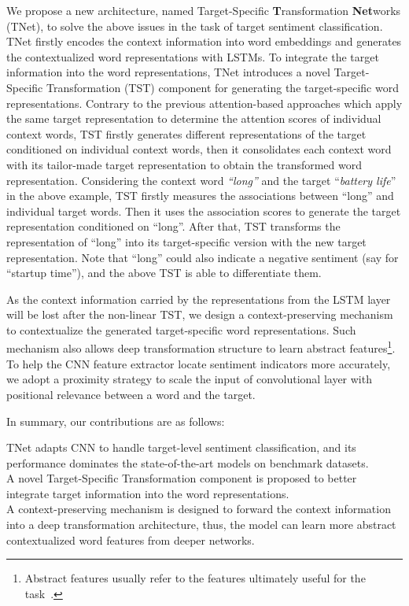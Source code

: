 \documentclass[11pt,a4paper]{article}
\begin{document}
We propose a new architecture, named Target-Specific \textbf{T}ransformation \textbf{Net}works (TNet), to solve the above issues in the task of target sentiment classification. TNet firstly encodes the context information into word embeddings and generates the contextualized word representations with LSTMs. To integrate the target information into the word representations, TNet introduces a novel Target-Specific Transformation (TST) component for generating the target-specific word representations. Contrary to the previous attention-based approaches which apply the same target representation to determine the attention scores of individual context words, TST firstly generates different representations of the target conditioned on individual context words, then it consolidates each context word with its tailor-made target representation to obtain the transformed word representation.
Considering the context word \textit{``long''} and the target ``\textit{battery life}'' in the above example, TST firstly measures the associations between ``long'' and individual target words. Then it uses the association scores to generate the target representation conditioned on ``long''. After that, TST transforms the representation of ``long'' into its target-specific version with the new target representation. Note that ``long'' could also indicate a negative sentiment (say for ``startup time''), and the above TST is able to differentiate them.



As the context information carried by the representations from the LSTM layer will be lost after the non-linear TST, we design a context-preserving mechanism to contextualize the generated target-specific word representations. Such mechanism also allows deep transformation structure to learn abstract features\footnote{Abstract features usually refer to the features ultimately useful for the task~\cite{bengio2013representation,lecun2015deep}.}. 
To help the CNN feature extractor locate sentiment indicators more accurately, we adopt a proximity strategy to scale the input of convolutional layer with positional relevance between a word and the target. 



In summary, our contributions are as follows: 

\indent    TNet adapts CNN to handle target-level sentiment classification, and its performance dominates the state-of-the-art models on benchmark datasets.\\
\indent    A novel Target-Specific Transformation component is proposed to better integrate target information into the word representations.
\\
\indent   A context-preserving mechanism is designed to forward the context information into a deep transformation architecture, thus, the model can learn more abstract contextualized word features from deeper networks.
\end{document}
